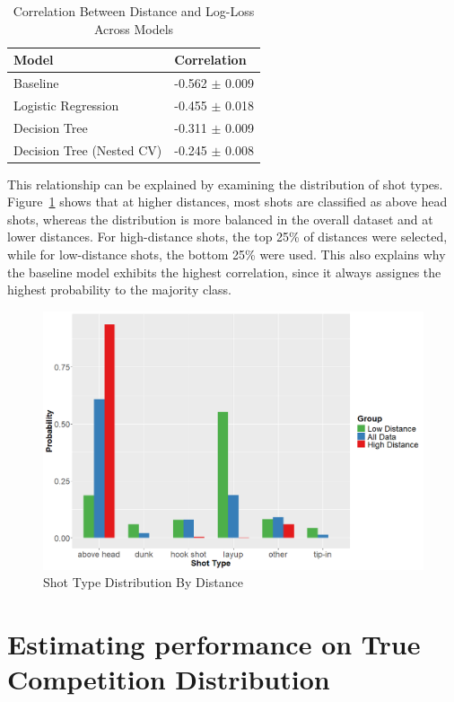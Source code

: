 \documentclass[9pt]{IEEEtran}
\begin{document}
\begin{table}[h]
    \begin{tabular}{l|l}
    Model                           & Correlation          \\
    \hline
    Baseline       & -0.562 $\pm$  0.009            \\
    Logistic Regression       & -0.455 $\pm$ 0.018              \\
    Decision Tree  &  -0.311 $\pm$  0.009            \\
    Decision Tree (Nested CV)  &-0.245 $\pm$  0.008
    \end{tabular}
    \vspace{2px}
    \caption{Correlation Between Distance and Log-Loss Across Models}
    \label{tab:correlation}
\end{table}
This relationship can be explained by examining the distribution of shot types. 
Figure~\ref{fig:shot_distr} shows that at higher distances, most shots are classified
 as above head shots, whereas the distribution is more balanced in the overall dataset
  and at lower distances. For high-distance shots, the top 25\% of distances were selected, 
  while for low-distance shots, the bottom 25\% were used. This also explains why 
  the baseline model exhibits the highest correlation, since it always assignes the highest 
  probability to the majority class.

\begin{figure}[h]
    \centering
    \includegraphics[width=0.95\columnwidth]{figures/shot_distr.png}
    \caption{Shot Type Distribution By Distance}
    \label{fig:shot_distr}
\end{figure}


\section{Estimating performance on True Competition Distribution}
\end{document}
